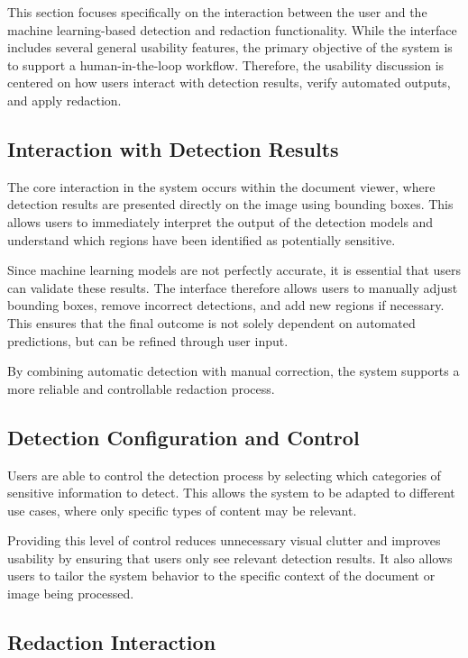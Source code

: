This section focuses specifically on the interaction between the user and the machine learning-based detection and redaction functionality. While the interface includes several general usability features, the primary objective of the system is to support a human-in-the-loop workflow. Therefore, the usability discussion is centered on how users interact with detection results, verify automated outputs, and apply redaction.

\subsection{Interaction with Detection Results}

The core interaction in the system occurs within the document viewer, where detection results are presented directly on the image using bounding boxes. This allows users to immediately interpret the output of the detection models and understand which regions have been identified as potentially sensitive.

Since machine learning models are not perfectly accurate, it is essential that users can validate these results. The interface therefore allows users to manually adjust bounding boxes, remove incorrect detections, and add new regions if necessary. This ensures that the final outcome is not solely dependent on automated predictions, but can be refined through user input.

By combining automatic detection with manual correction, the system supports a more reliable and controllable redaction process.

\subsection{Detection Configuration and Control}

Users are able to control the detection process by selecting which categories of sensitive information to detect. This allows the system to be adapted to different use cases, where only specific types of content may be relevant.

Providing this level of control reduces unnecessary visual clutter and improves usability by ensuring that users only see relevant detection results. It also allows users to tailor the system behavior to the specific context of the document or image being processed.

\subsection{Redaction Interaction}

